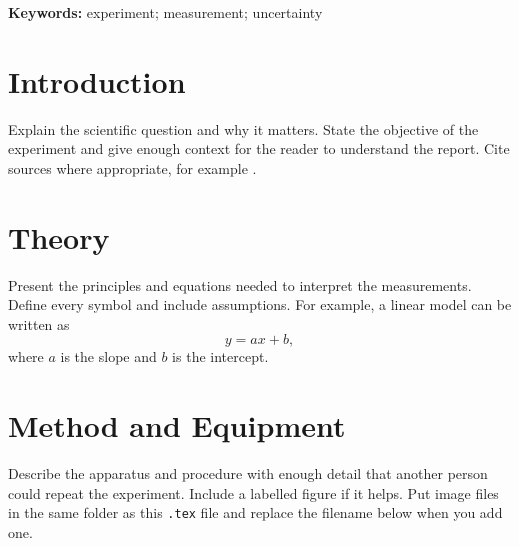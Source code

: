 \documentclass[5p,a4paper]{elsarticle}
\title{\reporttitle}
\author{\studentname\\\small \studentid\\\small \course\\\small \institution}
\date{\small Experiment: \labdate \quad\textbar\quad Submitted: \submissiondate}
\begin{document}
	\maketitle
	
	\begin{abstract}
		Briefly state the purpose of the experiment, the method, the most important
		quantitative result, and the main conclusion. Keep this self-contained and
		usually short. Example: The acceleration due to gravity was estimated from
		measurements of a falling object to be \SI{9.8}{\metre\per\second\squared},
		within the measurement uncertainty.
	\end{abstract}
	
	\noindent\textbf{Keywords:} experiment; measurement; uncertainty
	
	\section{Introduction}
	Explain the scientific question and why it matters. State the objective of the
	experiment and give enough context for the reader to understand the report.
	Cite sources where appropriate, for example \citep{example-reference}.
	
	\section{Theory}
	Present the principles and equations needed to interpret the measurements.
	Define every symbol and include assumptions. For example, a linear model can be
	written as
	\begin{equation}
		y = ax+b,
		\label{eq:linear-model}
	\end{equation}
	where $a$ is the slope and $b$ is the intercept.
	
	\section{Method and Equipment}
	Describe the apparatus and procedure with enough detail that another person
	could repeat the experiment. Include a labelled figure if it helps. Put image
	files in the same folder as this \texttt{.tex} file and replace the filename
	below when you add one.
	
	
\end{document}
